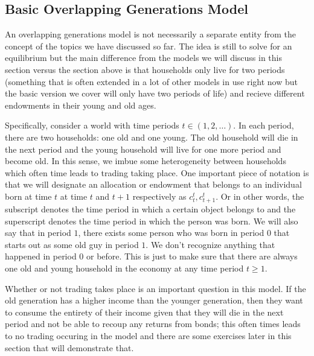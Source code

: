 \documentclass[11pt,english]{article}
\begin{document}
\subsection{Basic Overlapping Generations Model}
An overlapping generations model is not necessarily a separate entity from the concept of the topics we have discussed so far. The idea is still to solve for an equilibrium but the main difference from the models we will discuss in this section versus the section above is that households only live for two periods (something that is often extended in a lot of other models in use right now but the basic version we cover will only have two periods of life) and recieve different endowments in their young and old ages.

Specifically, consider a world with time periods $t\in (1,2,\ldots)$. In each period, there are two households: one old and one young. The old household will die in the next period and the young household will live for one more period and become old. In this sense, we imbue some heterogeneity between households which often time leads to trading taking place. One important piece of notation is that we will designate an allocation or endowment that belongs to an individual born at time $t$ at time $t$ and $t+1$ respectively as $c_t^t, c_{t+1}^t$. Or in other words, the subscript denotes the time period in which a certain object belongs to and the superscript denotes the time period in which the person was born. We will also say that in period $1$, there exists some person who was born in period $0$ that starts out as some old guy in period $1$. We don't recognize anything that happened in period 0 or before. This is just to make sure that there are always one old and young household in the economy at any time period $t\geq 1$.

Whether or not trading takes place is an important question in this model. If the old generation has a higher income than the younger generation, then they want to consume the entirety of their income given that they will die in the next period and not be able to recoup any returns from bonds; this often times leads to no trading occuring in the model and there are some exercises later in this section that will demonstrate that.
\end{document}
